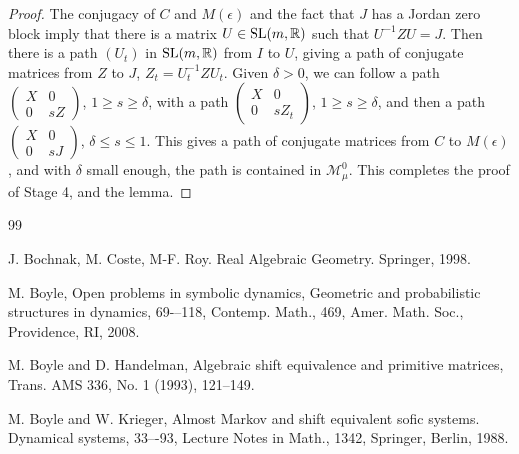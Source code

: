 \documentclass{amsart}
\theoremstyle{definition}
\theoremstyle{remark}
\numberwithin{equation}{section}
\begin{document}
{{\begin{proof}
The conjugacy of $C$ and $M(\epsilon )$  
and the fact that $J$ has a Jordan 
zero block imply that there is a matrix 
$U \in \textnormal{SL}(m, \mathbb R)$ such that    
$U^{-1}ZU=J$.  Then there is a path 
$(U_t)$ in  
$ \textnormal{SL}(m, \mathbb R)$ from $I$ to 
$U$, giving a path of conjugate matrices 
from $Z$ to $J$, 
$Z_t= U_t^{-1}ZU_t$. Given $\delta >0$, 
we can follow a path 
$\left(\begin{smallmatrix} X & 0 \\ 0 & sZ 
\end{smallmatrix} \right)$, $1\geq s\geq \delta$,  
with a path 
$\left(\begin{smallmatrix} X & 0 \\ 0 & sZ_t 
\end{smallmatrix} \right)$, $1\geq s\geq \delta$,  
and then a path 
$\left(\begin{smallmatrix} X & 0 \\ 0 & sJ 
\end{smallmatrix} \right)$, $\delta \leq s\leq 1$. 
This gives a path of conjugate matrices from 
$C$ to $M(\epsilon )$, and with  $\delta $ 
small enough,  the path is contained in  
$\mathcal M^0_{\mu}$.   
  This completes the proof of 
Stage 4, and the lemma. 

\end{proof} 



\begin{thebibliography}{99}

 J. Bochnak, M. Coste, M-F. Roy. 
Real Algebraic Geometry. Springer, 1998. 

 M. Boyle, Open problems in symbolic dynamics, 
Geometric and probabilistic structures in dynamics, 69-–118,
Contemp. Math., 469, Amer. Math. Soc., Providence, RI, 2008. 




 M. Boyle and D. Handelman,
Algebraic shift equivalence and primitive matrices,
Trans. AMS 336, No. 1 (1993), 121--149. 

M. Boyle and W. Krieger, 
Almost Markov and shift equivalent sofic systems. 
Dynamical systems, 33–-93, 
Lecture Notes in Math., 1342, Springer, Berlin, 1988.





\end{thebibliography}}}
\end{document}
